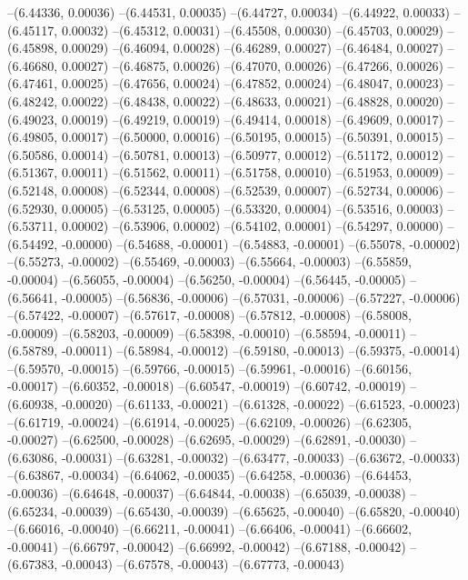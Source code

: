 --(6.44336, 0.00036)
--(6.44531, 0.00035)
--(6.44727, 0.00034)
--(6.44922, 0.00033)
--(6.45117, 0.00032)
--(6.45312, 0.00031)
--(6.45508, 0.00030)
--(6.45703, 0.00029)
--(6.45898, 0.00029)
--(6.46094, 0.00028)
--(6.46289, 0.00027)
--(6.46484, 0.00027)
--(6.46680, 0.00027)
--(6.46875, 0.00026)
--(6.47070, 0.00026)
--(6.47266, 0.00026)
--(6.47461, 0.00025)
--(6.47656, 0.00024)
--(6.47852, 0.00024)
--(6.48047, 0.00023)
--(6.48242, 0.00022)
--(6.48438, 0.00022)
--(6.48633, 0.00021)
--(6.48828, 0.00020)
--(6.49023, 0.00019)
--(6.49219, 0.00019)
--(6.49414, 0.00018)
--(6.49609, 0.00017)
--(6.49805, 0.00017)
--(6.50000, 0.00016)
--(6.50195, 0.00015)
--(6.50391, 0.00015)
--(6.50586, 0.00014)
--(6.50781, 0.00013)
--(6.50977, 0.00012)
--(6.51172, 0.00012)
--(6.51367, 0.00011)
--(6.51562, 0.00011)
--(6.51758, 0.00010)
--(6.51953, 0.00009)
--(6.52148, 0.00008)
--(6.52344, 0.00008)
--(6.52539, 0.00007)
--(6.52734, 0.00006)
--(6.52930, 0.00005)
--(6.53125, 0.00005)
--(6.53320, 0.00004)
--(6.53516, 0.00003)
--(6.53711, 0.00002)
--(6.53906, 0.00002)
--(6.54102, 0.00001)
--(6.54297, 0.00000)
--(6.54492, -0.00000)
--(6.54688, -0.00001)
--(6.54883, -0.00001)
--(6.55078, -0.00002)
--(6.55273, -0.00002)
--(6.55469, -0.00003)
--(6.55664, -0.00003)
--(6.55859, -0.00004)
--(6.56055, -0.00004)
--(6.56250, -0.00004)
--(6.56445, -0.00005)
--(6.56641, -0.00005)
--(6.56836, -0.00006)
--(6.57031, -0.00006)
--(6.57227, -0.00006)
--(6.57422, -0.00007)
--(6.57617, -0.00008)
--(6.57812, -0.00008)
--(6.58008, -0.00009)
--(6.58203, -0.00009)
--(6.58398, -0.00010)
--(6.58594, -0.00011)
--(6.58789, -0.00011)
--(6.58984, -0.00012)
--(6.59180, -0.00013)
--(6.59375, -0.00014)
--(6.59570, -0.00015)
--(6.59766, -0.00015)
--(6.59961, -0.00016)
--(6.60156, -0.00017)
--(6.60352, -0.00018)
--(6.60547, -0.00019)
--(6.60742, -0.00019)
--(6.60938, -0.00020)
--(6.61133, -0.00021)
--(6.61328, -0.00022)
--(6.61523, -0.00023)
--(6.61719, -0.00024)
--(6.61914, -0.00025)
--(6.62109, -0.00026)
--(6.62305, -0.00027)
--(6.62500, -0.00028)
--(6.62695, -0.00029)
--(6.62891, -0.00030)
--(6.63086, -0.00031)
--(6.63281, -0.00032)
--(6.63477, -0.00033)
--(6.63672, -0.00033)
--(6.63867, -0.00034)
--(6.64062, -0.00035)
--(6.64258, -0.00036)
--(6.64453, -0.00036)
--(6.64648, -0.00037)
--(6.64844, -0.00038)
--(6.65039, -0.00038)
--(6.65234, -0.00039)
--(6.65430, -0.00039)
--(6.65625, -0.00040)
--(6.65820, -0.00040)
--(6.66016, -0.00040)
--(6.66211, -0.00041)
--(6.66406, -0.00041)
--(6.66602, -0.00041)
--(6.66797, -0.00042)
--(6.66992, -0.00042)
--(6.67188, -0.00042)
--(6.67383, -0.00043)
--(6.67578, -0.00043)
--(6.67773, -0.00043)
